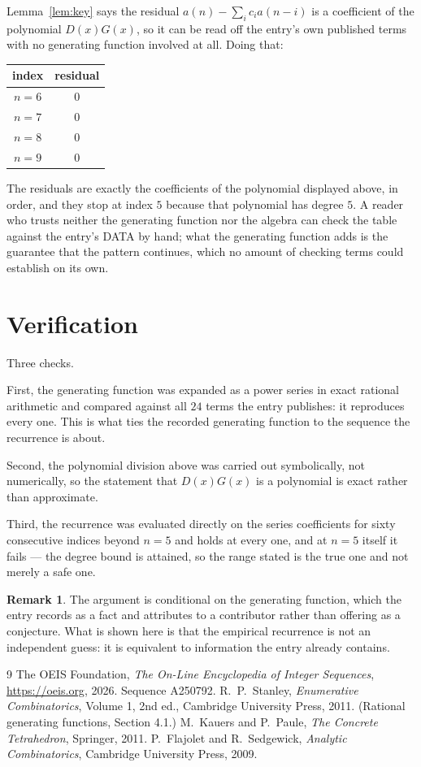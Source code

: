 \documentclass[11pt,a4paper]{article}
\theoremstyle{plain}
\theoremstyle{definition}
\newtheorem{remark}[theorem]{Remark}
\begin{document}
Lemma~\ref{lem:key} says the residual $a(n)-\sum_ic_ia(n-i)$ is a coefficient of the
polynomial $D(x)G(x)$, so it can be read off the entry's own published terms with no
generating function involved at all. Doing that:
\begin{center}
\begin{tabular}{cc}
index & residual \\ \hline
$n=6$ & $0$ \\
$n=7$ & $0$ \\
$n=8$ & $0$ \\
$n=9$ & $0$
\end{tabular}
\end{center}
The residuals are exactly the coefficients of the polynomial displayed above, in order, and
they stop at index $5$ because that polynomial has degree $5$. A reader who trusts
neither the generating function nor the algebra can check the table against the entry's DATA
by hand; what the generating function adds is the guarantee that the pattern continues, which
no amount of checking terms could establish on its own.

\section{Verification}

Three checks.

First, the generating function was expanded as a power series in exact rational arithmetic and
compared against all $24$ terms the entry publishes: it reproduces every one. This is
what ties the recorded generating function to the sequence the recurrence is about.

Second, the polynomial division above was carried out symbolically, not numerically, so the
statement that $D(x)G(x)$ is a polynomial is exact rather than approximate.

Third, the recurrence was evaluated directly on the series coefficients for sixty consecutive
indices beyond $n=5$ and holds at every one, and at $n=5$ itself it fails --- the
degree bound is attained, so the range stated is the true one and not merely a safe one.

\begin{remark}
The argument is conditional on the generating function, which the entry records as a fact and
attributes to a contributor rather than offering as a conjecture. What is shown here is that
the empirical recurrence is not an independent guess: it is equivalent to information the
entry already contains.
\end{remark}

\begin{thebibliography}{9}
 The OEIS Foundation, \emph{The On-Line Encyclopedia of Integer
Sequences}, \url{https://oeis.org}, 2026. Sequence A250792.
 R.~P.~Stanley, \emph{Enumerative Combinatorics}, Volume 1, 2nd ed.,
Cambridge University Press, 2011. (Rational generating functions, Section 4.1.)
 M.~Kauers and P.~Paule, \emph{The Concrete Tetrahedron}, Springer, 2011.
 P.~Flajolet and R.~Sedgewick, \emph{Analytic Combinatorics}, Cambridge
University Press, 2009.
\end{thebibliography}
\end{document}
